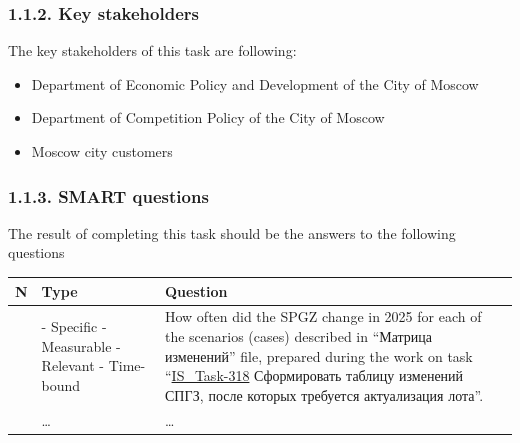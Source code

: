 \documentclass[
]{article}
\begin{document}
\subsubsection{\texorpdfstring{\textbf{1.1.2. Key
stakeholders}}{1.1.2. Key stakeholders}}\label{key-stakeholders}

The key stakeholders of this task are following:

\begin{itemize}
\item
  Department of Economic Policy and Development of the City of Moscow
\item
  Department of Competition Policy of the City of Moscow
\item
  Moscow city customers
\end{itemize}

\subsubsection{\texorpdfstring{\textbf{1.1.3. SMART
questions}}{1.1.3. SMART questions}}\label{smart-questions}

The result of completing this task should be the answers to the
following questions

\begin{longtable}[]{@{}
  >{\raggedright\arraybackslash}p{}
  >{\raggedright\arraybackslash}p{}
  >{\raggedright\arraybackslash}p{}@{}}
\toprule\noalign{}
\begin{minipage}[b]{\linewidth}\raggedright
\textbf{N}
\end{minipage} & \begin{minipage}[b]{\linewidth}\raggedright
\textbf{Type}
\end{minipage} & \begin{minipage}[b]{\linewidth}\raggedright
\textbf{Question}
\end{minipage} \\
\midrule\noalign{}
\endhead
\bottomrule\noalign{}
\endlastfoot
1 & - Specific - Measurable - Relevant - Time-bound & How often did the
SPGZ change in 2025 for each of the scenarios (cases) described in
``Матрица изменений'' file, prepared during the work on task
``\href{https://youtrack.gbuac.moscow/issue/IS_Task-318/Sformirovat-tablicu-izmenenij-SPGZ-posle-kotoryh-trebuetsya-aktualizaciya-lota}{IS\_Task-318}
Сформировать таблицу изменений СПГЗ, после которых требуется
актуализация лота''. \\
2 & \ldots{} & \ldots{} \\
\end{longtable}
\end{document}
